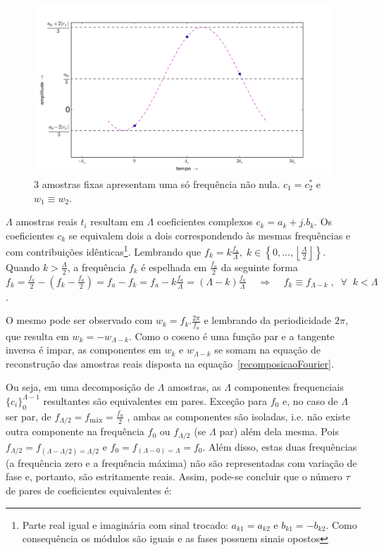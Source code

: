 \begin{figure}[h!]
    \centering
        \includegraphics[width=\textwidth]{figuras/amostras3b}
    \caption{3 amostras fixas apresentam uma só frequência não nula. $c_1=c_2^*$ e $w_1 \equiv w_2$.}
        \label{fig:amostras3}
\end{figure}



$\Lambda$ amostras reais $t_i$ resultam em $\Lambda$ coeficientes complexos $c_k=a_k+j.b_k$. Os coeficientes $c_k$ se equivalem dois a dois correspondendo às mesmas frequências e com contribuições idênticas\footnote{Parte real igual e imaginária com sinal trocado: $a_{k1}=a_{k2}$ e $b_{k1}=-b_{k2}$. Como consequência os módulos são iguais e as fases possuem sinais opostos}. Lembrando que $f_k = k\frac{f_a}{\Lambda}, \; k \in \left\{0, ..., \left \lfloor \frac{\Lambda}{2} \right \rfloor \right\} $. Quando $k> \frac{\Lambda}{2} $,
a frequência $f_k$ é espelhada em $\frac{f_a}{2}$ da seguinte forma $f_k=\frac{f_a}{2} - (f_k-\frac{f_a}{2})=f_a-f_k=f_a - k\frac{f_a}{\Lambda}=(\Lambda-k)\frac{f_a}{\Lambda} \;\;\;\; \Rightarrow \;\;\;\; f_k\equiv f_{\Lambda-k} \; ,\;\; \forall \;\; k<\Lambda$. 

 
 O mesmo pode ser observado com 
 $w_k=f_k.\frac{2\pi}{f_a}$ e lembrando da periodicidade $2\pi$, que resulta em $w_k=-w_{\Lambda-k}$. Como o coseno é uma função par e a tangente inversa é impar, as componentes em $w_k$ e $w_{\Lambda-k}$ se somam na equação de reconstrução das amostras reais disposta na equação~\ref{recomposicaoFourier}.

  Ou seja, em uma decomposição de $\Lambda$ amostras, as $\Lambda$ componentes frequenciais $\{c_i\}_0^{\Lambda-1}$ resultantes
   são equivalentes em pares.
   Exceção para $f_0$ e, no caso de $\Lambda$ ser par, de $f_{\Lambda/2}=f_{\text{máx}}=\frac{f_a}{2}$ , ambas as componentes são isoladas, i.e. não existe outra componente na frequência $f_0$ ou $f_{\Lambda/2}$ (se $\Lambda$ par) além dela mesma. 
Pois $f_{\Lambda/2}=f_{(\Lambda-\Lambda/2) = \Lambda/2}$ e $f_0=f_{(\Lambda-0)=\Lambda}=f_0$.
Além disso, estas duas frequências (a frequência zero e a frequência máxima) não são representadas com variação de fase e, portanto, são estritamente reais. Assim, pode-se
   concluir que o número $\tau$ de pares de coeficientes equivalentes é:

